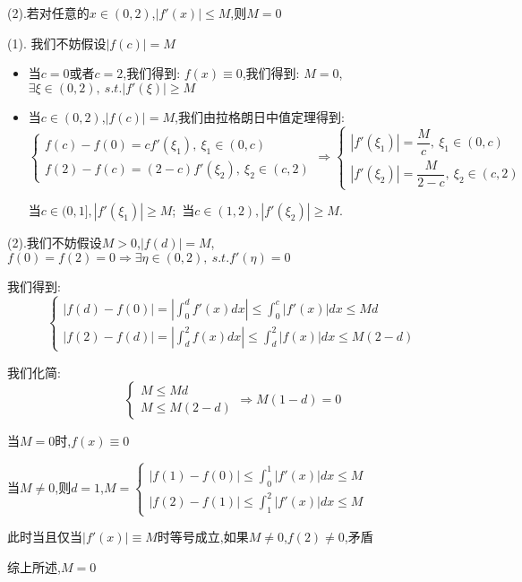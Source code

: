(2).若对任意的$x\in(0,2)$,$|f'(x)|\leq M$,则$M=0$
\begin{solution}
	
	(1). 我们不妨假设$|f(c)|=M$
	\begin{itemize}
		\item 当$c=0\text{或者}c=2$,我们得到: $f(x)\equiv 0$,我们得到: $M=0$,$\exists\xi\in(0,2),\ s.t. |f'(\xi)|\geq M$
		\item 当$c\in(0,2)$,$|f(c)|=M$,我们由拉格朗日中值定理得到: 
		$$\left\lbrace
		\begin{array}{l}
			f(c)-f(0)=cf'(\xi_{1}),\ \xi_{1}\in(0,c)\\
			f(2)-f(c)=(2-c)f'(\xi_{2}),\ \xi_{2}\in(c,2)
		\end{array}
		\right. \Rightarrow \left\lbrace
		\begin{array}{l}
			|f'(\xi_{1})|=\dfrac{M}{c},\ \xi_{1}\in(0,c)\\
			|f'(\xi_{2})|=\dfrac{M}{2-c},\ \xi_{2}\in(c,2)
		\end{array}
		\right. $$
		
		当$c\in(0,1],|f'(\xi_{1})|\geq M$;\ 当$c\in(1,2),|f'(\xi_{2})|\geq M$.
	\end{itemize}
	
	(2).我们不妨假设$M>0$,$|f(d)|=M$,$f(0)=f(2)=0\Rightarrow \exists \eta\in(0,2),\ s.t. f'(\eta)=0$
	
	我们得到: 
	$$\left\lbrace
	\begin{array}{l}
		|f(d)-f(0)|=|\int_{0}^{d}f'(x)dx|\leq \int_{0}^{c}|f'(x)|dx\leq Md\\
		|f(2)-f(d)|=|\int_{d}^{2}f(x)dx|\leq \int_{d}^{2}|f(x)|dx\leq M(2-d)
	\end{array}
	\right.$$

	我们化简:
	$$\left\lbrace
	\begin{array}{l}
		M\leq Md\\
		M\leq M(2-d)
	\end{array}
	\right.  
	\Rightarrow 
	M(1-d)=0$$
	
	当$M=0$时,$f(x)\equiv 0$
	
	当$M\neq 0$,则$d=1$,$M=\left\lbrace
	\begin{array}{l}
		|f(1)-f(0)|\leq \int_{0}^{1}|f'(x)|dx\leq M\\
		|f(2)-f(1)|\leq \int_{1}^{2}|f'(x)|dx\leq M
	\end{array}
	\right. $	
	
	此时当且仅当$|f'(x)|\equiv M$时等号成立,如果$M\neq 0$,$f(2)\neq 0$,矛盾
	
	综上所述,$M=0$
\end{solution}

